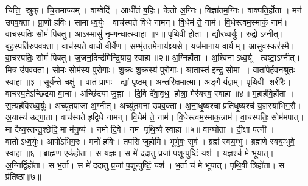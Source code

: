 
\setcounter{anuvakam}{0}
चित्ति॒ स्रुक्। चि॒त्तमाज्यम्। वाग्वेदि॑। आधी॑तं ब॒\ar{}हिः। केतो॑ अ॒ग्निः। विज्ञा॑तम॒ग्निः। वाक्प॑ति॒र्\mbox{}होता। मन॑ उपव॒क्ता। प्रा॒णो ह॒विः। सामाध्व॒र्युः। वाच॑स्पते विधे नामन्। वि॒धेम॑ ते॒ नाम॑। वि॒धेस्त्वम॒स्माकं॒ नाम॑। वा॒चस्पतिः॒ सोमं॑ पिबतु। आऽस्मासु॑ नृ॒म्णन्धा॒त्स्वाहा॥१॥
\anuvakamend[अ॒ध्व॒र्युः पञ्च॑ च]
पृ॒थि॒वी होता। द्यौर॑ध्व॒र्युः। रु॒द्रोऽग्नीत्। बृह॒स्पति॑रुपव॒क्ता। वाच॑स्पते वा॒चो वी॒र्ये॑ण। सम्भृ॑ततमे॒नाय॑क्ष्यसे। यज॑मानाय॒ वार्यम्। आसुव॒स्कर॑स्मै। वा॒चस्पतिः॒ सोमं॑ पिबतु। ज॒जन॒दिन्द्र॑\-मिन्द्रि॒याय॒ स्वाहा॥२॥%
\anuvakamend[पृ॒थि॒वी होता॒ दश॑]
अ॒ग्निर्\mbox{}होता। अ॒श्विनाऽध्व॒र्यू। त्वष्टा॒ऽग्नीत्। मि॒त्र उ॑पव॒क्ता। सोमः॒ सोम॑स्य पुरो॒गाः। शु॒क्रः  शु॒क्रस्य॑ पुरो॒गाः। श्रा॒तास्त॑ इन्द्र॒ सोमा। वाता॑पेर्\mbox{}हवन॒श्रुतः॒ स्वाहा॥३॥%
\anuvakamend[अ॒ग्निर्होता॒ऽष्टौ]
सूर्य॑न्ते॒ चक्षु॑। वातं॑ प्रा॒णः। द्यां पृ॒ष्ठम्। अ॒न्तरि॑क्षमा॒त्मा। अङ्गैर्\mbox{}य॒ज्ञम्। पृ॒थि॒वी शरी॑रैः। वाच॑स्प॒तेऽच्छि॑द्रया वा॒चा। अच्छि॑द्रया जु॒ह्वा। दि॒वि दे॑वा॒वृध॒ होत्रा॒ मेर॑यस्व॒ स्वाहा॥४॥
\anuvakamend[सूर्य॑न्ते॒ नव॑]
म॒हाह॑वि॒र्\mbox{}होता। स॒त्यह॑विरध्व॒र्युः। अच्यु॑तपाजा अ॒ग्नीत्। अच्यु॑तमना उपव॒क्ता। अ॒ना॒धृ॒ष्यश्चाप्रतिधृ॒ष्यश्च॑ य॒ज्ञस्या॑भिग॒रौ। अ॒यास्य॑ उद्गा॒ता। वाच॑स्पते हृद्विधे नामन्। वि॒धेम॑ ते॒ नाम॑। वि॒धेस्त्वम॒स्माक॒न्नाम॑। वा॒चस्पतिः॒ सोम॑मपात्। मा दैव्य॒स्तन्तु॒श्छेदि॒ मा म॑नु॒ष्य॑। नमो॑ दि॒वे। नम॑ पृथि॒व्यै स्वाहा॥५॥%
\anuvakamend[अ॒पा॒त्त्रीणि॑ च]
वाग्घोता। दी॒क्षा पत्नी। वातोऽध्व॒र्युः। आपो॑ऽभिग॒रः। मनो॑ ह॒विः। तप॑सि जुहोमि। भूर्भुवः॒ सुव॑। ब्रह्म॑ स्वय॒म्भु। ब्रह्म॑णे स्वय॒म्भुवे॒ स्वाहा॥६॥
\anuvakamend[वाग्घोता॒ नव॑]
ब्रा॒ह्म॒ण एक॑होता। स य॒ज्ञः। स मे॑ ददातु प्र॒जां प॒शून्पुष्टिं॒ यश॑। य॒ज्ञश्च॑ मे भूयात्। अ॒ग्निर्द्विहो॑ता। स भ॒र्ता। स मे॑ ददातु प्र॒जां प॒शून्पुष्टिं॒ यश॑। भ॒र्ता च॑ मे भूयात्। पृ॒थि॒वी त्रिहो॑ता। स प्र॑ति॒ष्ठा॥७॥%
